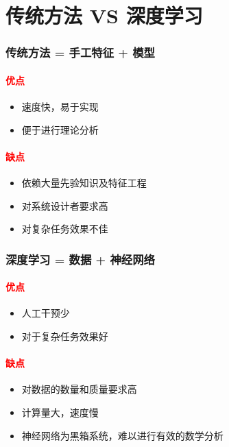 \documentclass[UTF8]{beamer}
\begin{document}
\section{传统方法 VS 深度学习}

\begin{frame}
  \frametitle{传统方法 = 手工特征 + 模型}

  \textcolor{red}{\paragraph{优点}}
  \begin{itemize}
    \item 速度快，易于实现
    \item 便于进行理论分析   
  \end{itemize}

  \textcolor{red}{\paragraph{缺点}}
  \begin{itemize}
    \item 依赖大量先验知识及特征工程
    \item 对系统设计者要求高
    \item 对复杂任务效果不佳
  \end{itemize}
\end{frame}

\begin{frame}
  \frametitle{深度学习 = 数据 + 神经网络}

  \textcolor{red}{\paragraph{优点}}
  \begin{itemize}
    \item 人工干预少
    \item 对于复杂任务效果好
  \end{itemize}

  \textcolor{red}{\paragraph{缺点}}
  \begin{itemize}
    \item 对数据的数量和质量要求高
    \item 计算量大，速度慢
    \item 神经网络为黑箱系统，难以进行有效的数学分析
  \end{itemize}
\end{frame}
\end{document}
